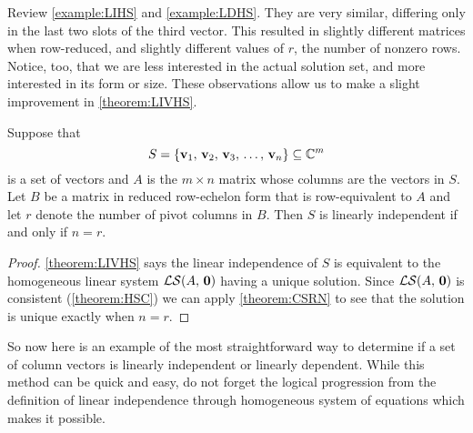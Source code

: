 \documentclass{ximera}
\begin{document}
Review \ref{example:LIHS} and \ref{example:LDHS}.  They are very
similar, differing only in the last two slots of the third vector.
This resulted in slightly different matrices when row-reduced, and
slightly different values of $r$, the number of nonzero rows.  Notice,
too, that we are less interested in the actual solution set, and more
interested in its form or size.  These observations allow us to make a
slight improvement in \ref{theorem:LIVHS}.

\begin{theorem}
  \label{theorem:LIVRN} Suppose that
  \[
    S=\left\{\mathbf{v}_{1},\,\mathbf{v}_{2},\,\mathbf{v}_{3},\,\ldots,\,\mathbf{v}_{n}\right\}\subseteq\mathbb{C}^{m}
  \] is a set of vectors and $A$ is the $m\times n$ matrix whose
  columns are the vectors in $S$.  Let $B$ be a matrix in reduced
  row-echelon form that is row-equivalent to $A$ and let $r$ denote
  the number of pivot columns in $B$.  Then $S$ is linearly
  independent if and only if $n=r$.
\begin{proof}
  \ref{theorem:LIVHS} says the linear independence of $S$ is
  equivalent to the homogeneous linear system $\mathcal{LS}\!\left(A,\,\mathbf{0}\right)$ having
  a unique solution.  Since $\mathcal{LS}\!\left(A,\,\mathbf{0}\right)$ is consistent
  (\ref{theorem:HSC}) we can apply \ref{theorem:CSRN} to see that the
  solution is unique exactly when $n=r$.
\end{proof}
\end{theorem}

So now here is an example of the most straightforward way to determine
if a set of column vectors is linearly independent or linearly
dependent.  While this method can be quick and easy, do not forget the
logical progression from the definition of linear independence through
homogeneous system of equations which makes it possible.
\end{document}
